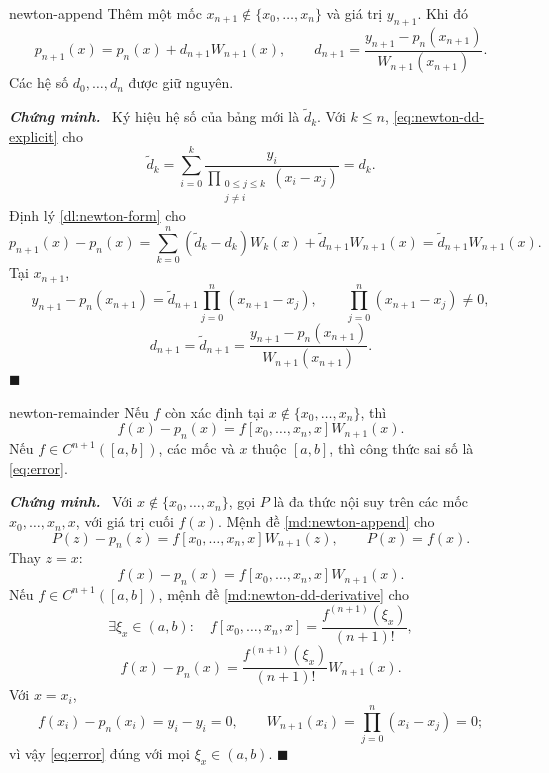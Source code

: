 \documentclass[12pt,a4paper,oneside]{book}
\numberwithin{algorithm}{chapter}
\theoremstyle{definition}
\newenvironment{chungminh}{\par\medskip\noindent\textbf{\textit{\color{mainblue}Chứng minh.}}\ }{\hfill$\blacksquare$\par\medskip}
\begin{document}
\begin{menhde}{}{newton-append}
Thêm một mốc $x_{n+1}\notin\{x_0,\ldots,x_n\}$ và giá trị $y_{n+1}$. Khi đó
\begin{equation}\label{eq:newton-append}
 p_{n+1}(x)=p_n(x)+d_{n+1}W_{n+1}(x),\qquad
 d_{n+1}=\frac{y_{n+1}-p_n(x_{n+1})}{W_{n+1}(x_{n+1})}.
\end{equation}
Các hệ số $d_0,\ldots,d_n$ được giữ nguyên.
\end{menhde}
\begin{chungminh}
Ký hiệu hệ số của bảng mới là $\widetilde d_k$. Với $k\leq n$, \eqref{eq:newton-dd-explicit} cho
\[
 \widetilde d_k
 =\sum_{i=0}^{k}\frac{y_i}{\prod_{\substack{0\leq j\leq k\\j\ne i}}(x_i-x_j)}
 =d_k.
\]
Định lý \ref{dl:newton-form} cho
\[
 p_{n+1}(x)-p_n(x)
 =\sum_{k=0}^{n}(\widetilde d_k-d_k)W_k(x)
   +\widetilde d_{n+1}W_{n+1}(x)
 =\widetilde d_{n+1}W_{n+1}(x).
\]
Tại $x_{n+1}$,
\[
 y_{n+1}-p_n(x_{n+1})
 =\widetilde d_{n+1}\prod_{j=0}^{n}(x_{n+1}-x_j),
 \qquad\prod_{j=0}^{n}(x_{n+1}-x_j)\ne0,
\]
\[
 d_{n+1}=\widetilde d_{n+1}
 =\frac{y_{n+1}-p_n(x_{n+1})}{W_{n+1}(x_{n+1})}.
\]
\end{chungminh}

\begin{menhde}{}{newton-remainder}
Nếu $f$ còn xác định tại $x\notin\{x_0,\ldots,x_n\}$, thì
\begin{equation}\label{eq:newton-remainder}
 f(x)-p_n(x)=f[x_0,\ldots,x_n,x]W_{n+1}(x).
\end{equation}
Nếu $f\in C^{n+1}([a,b])$, các mốc và $x$ thuộc $[a,b]$, thì công thức sai số là \eqref{eq:error}.
\end{menhde}
\begin{chungminh}
Với $x\notin\{x_0,\ldots,x_n\}$, gọi $P$ là đa thức nội suy trên các mốc $x_0,\ldots,x_n,x$, với giá trị cuối $f(x)$. Mệnh đề \ref{md:newton-append} cho
\[
 P(z)-p_n(z)=f[x_0,\ldots,x_n,x]W_{n+1}(z),
 \qquad P(x)=f(x).
\]
Thay $z=x$:
\[
 f(x)-p_n(x)=f[x_0,\ldots,x_n,x]W_{n+1}(x).
\]
Nếu $f\in C^{n+1}([a,b])$, mệnh đề \ref{md:newton-dd-derivative} cho
\[
 \exists\xi_x\in(a,b):\quad
 f[x_0,\ldots,x_n,x]=\frac{f^{(n+1)}(\xi_x)}{(n+1)!},
\]
\[
 f(x)-p_n(x)=\frac{f^{(n+1)}(\xi_x)}{(n+1)!}W_{n+1}(x).
\]
Với $x=x_i$,
\[
 f(x_i)-p_n(x_i)=y_i-y_i=0,
 \qquad W_{n+1}(x_i)=\prod_{j=0}^{n}(x_i-x_j)=0;
\]
vì vậy \eqref{eq:error} đúng với mọi $\xi_x\in(a,b)$.
\end{chungminh}
\end{document}
